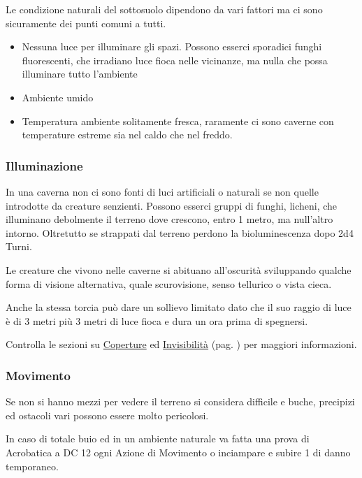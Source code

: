 \begin{multicols}{2}
Le condizione naturali del sottosuolo dipendono da vari fattori ma ci sono sicuramente dei punti comuni a tutti.

\begin{itemize}[leftmargin=*] \setlength{\itemsep}{0pt}
\item Nessuna luce per illuminare gli spazi. Possono esserci sporadici funghi fluorescenti, che irradiano luce fioca nelle vicinanze, ma nulla che possa illuminare tutto l'ambiente
\item Ambiente umido
\item Temperatura ambiente solitamente fresca, raramente ci sono caverne con temperature estreme sia nel caldo che nel freddo.
\end{itemize}

\subsubsection{Illuminazione}

In una caverna non ci sono fonti di luci artificiali o naturali se non quelle introdotte da creature senzienti. Possono esserci gruppi di funghi, licheni, che illuminano debolmente il terreno dove crescono, entro 1 metro, ma null'altro intorno.
Oltretutto se strappati dal terreno perdono la bioluminescenza dopo 2d4 Turni.

Le creature che vivono nelle caverne si abituano all'oscurità sviluppando qualche forma di visione alternativa, quale scurovisione, senso tellurico o vista cieca.

Anche la stessa torcia può dare un sollievo limitato dato che il suo raggio di luce è di 3 metri più 3 metri di luce fioca e dura un ora prima di spegnersi.

Controlla le sezioni su \hyperlink{copertura}{Coperture} ed \hyperlink{invisibilita}{Invisibilità} (pag. \pageref{invisibilita}) per maggiori informazioni.

\subsubsection{Movimento}

Se non si hanno mezzi per vedere il terreno si considera difficile e buche, precipizi ed ostacoli vari possono essere molto pericolosi.

In caso di totale buio ed in un ambiente naturale va fatta una prova di Acrobatica a DC 12 ogni Azione di Movimento o inciampare e subire 1 di danno temporaneo.


\end{multicols}
